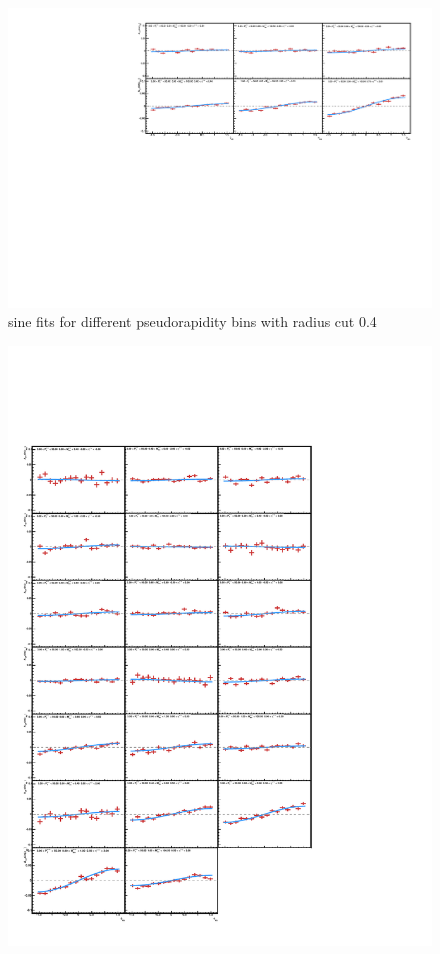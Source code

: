 \documentclass[letterpaper, abstract = on,listof=totoc, bibliography=totoc]{scrreprt}
\begin{document}
\begin{appendices}
\begin{figure}
\begin{center}
\includegraphics[width = 1\textwidth]{cone4Veta_fullEtaV2.pdf}
\caption[sine fits for different pseudorapidity bins with radius cut 0.4]{sine fits for different pseudorapidity bins with radius cut 0.4}
\label{}
\end{center}
\end{figure}

\begin{figure}
\begin{center}
\includegraphics[width = .75\textwidth]{2dMassEta.pdf}
\caption[]{}
\label{}
\end{center}
\end{figure}


\end{appendices}
\end{document}

